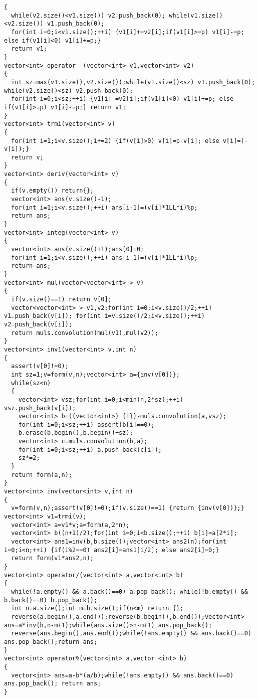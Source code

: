 \begin{lstlisting}
{
  while(v2.size()<v1.size()) v2.push_back(0); while(v1.size()<v2.size()) v1.push_back(0);
  for(int i=0;i<v1.size();++i) {v1[i]+=v2[i];if(v1[i]>=p) v1[i]-=p; else if(v1[i]<0) v1[i]+=p;}
  return v1;
}
vector<int> operator -(vector<int> v1,vector<int> v2)
{
  int sz=max(v1.size(),v2.size());while(v1.size()<sz) v1.push_back(0); while(v2.size()<sz) v2.push_back(0);
  for(int i=0;i<sz;++i) {v1[i]-=v2[i];if(v1[i]<0) v1[i]+=p; else if(v1[i]>=p) v1[i]-=p;} return v1;
}
vector<int> trmi(vector<int> v)
{
  for(int i=1;i<v.size();i+=2) {if(v[i]>0) v[i]=p-v[i]; else v[i]=(-v[i]);}
  return v;
}
vector<int> deriv(vector<int> v)
{
  if(v.empty()) return{};
  vector<int> ans(v.size()-1);
  for(int i=1;i<v.size();++i) ans[i-1]=(v[i]*1LL*i)%p;
  return ans;
}
vector<int> integ(vector<int> v)
{
  vector<int> ans(v.size()+1);ans[0]=0;
  for(int i=1;i<v.size();++i) ans[i-1]=(v[i]*1LL*i)%p;
  return ans;
}
vector<int> mul(vector<vector<int> > v)
{
  if(v.size()==1) return v[0];
  vector<vector<int> > v1,v2;for(int i=0;i<v.size()/2;++i) v1.push_back(v[i]); for(int i=v.size()/2;i<v.size();++i) v2.push_back(v[i]);
  return muls.convolution(mul(v1),mul(v2));
}
vector<int> inv1(vector<int> v,int n)
{
  assert(v[0]!=0);
  int sz=1;v=form(v,n);vector<int> a={inv(v[0])};
  while(sz<n)
  {
    vector<int> vsz;for(int i=0;i<min(n,2*sz);++i) vsz.push_back(v[i]);
    vector<int> b=((vector<int>) {1})-muls.convolution(a,vsz);
    for(int i=0;i<sz;++i) assert(b[i]==0);
    b.erase(b.begin(),b.begin()+sz);
    vector<int> c=muls.convolution(b,a);
    for(int i=0;i<sz;++i) a.push_back(c[i]);
    sz*=2;
  }
  return form(a,n);
}
vector<int> inv(vector<int> v,int n)
{
  v=form(v,n);assert(v[0]!=0);if(v.size()==1) {return {inv(v[0])};} vector<int> v1=trmi(v);
  vector<int> a=v1*v;a=form(a,2*n);
  vector<int> b((n+1)/2);for(int i=0;i<b.size();++i) b[i]=a[2*i];
  vector<int> ans1=inv(b,b.size());vector<int> ans2(n);for(int i=0;i<n;++i) {if(i%2==0) ans2[i]=ans1[i/2]; else ans2[i]=0;}
  return form(v1*ans2,n);
}
vector<int> operator/(vector<int> a,vector<int> b)
{
  while(!a.empty() && a.back()==0) a.pop_back(); while(!b.empty() && b.back()==0) b.pop_back();
  int n=a.size();int m=b.size();if(n<m) return {};
  reverse(a.begin(),a.end());reverse(b.begin(),b.end());vector<int> ans=a*inv(b,n-m+1);while(ans.size()>n-m+1) ans.pop_back();
  reverse(ans.begin(),ans.end());while(!ans.empty() && ans.back()==0) ans.pop_back();return ans;
}
vector<int> operator%(vector<int> a,vector <int> b)
{
  vector<int> ans=a-b*(a/b);while(!ans.empty() && ans.back()==0) ans.pop_back(); return ans;
}
\end{lstlisting}
